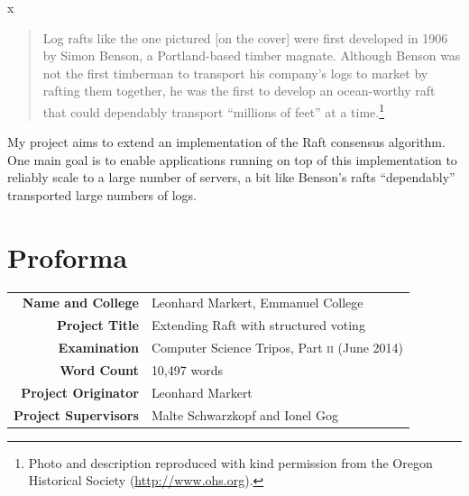 \documentclass[12pt,chapterprefix=true,toc=bibliography,numbers=noendperiod,
               footnotes=multiple,twoside]{scrreprt}
\begin{document}



\begin{titlepage}


{\color{white}x}

\vfil

\begin{quote}
Log rafts like the one pictured [on the cover] were first developed in 1906 by Simon Benson, a Portland-based timber magnate. Although Benson was not the first timberman to transport his company's logs to market by rafting them together, he was the first to develop an ocean-worthy raft that could dependably transport \enquote{millions of feet} at a time.\footnote{Photo \parencite{benson} and description reproduced with kind permission from the Oregon Historical Society (\url{http://www.ohs.org}).}
\end{quote}

My project aims to extend an implementation of the Raft consensus algorithm. One main goal is to enable applications running on top of this implementation to reliably scale to a large number of servers, a bit like Benson's rafts \enquote{dependably} transported large numbers of logs.

\end{titlepage}

\chapter*{Proforma}
\label{ch:proforma}

\begin{center}
{\renewcommand{\arraystretch}{1.5}%
\begin{tabularx}{359pt}{rX}
\textbf{Name and College} & Leonhard Markert, Emmanuel College \\
\textbf{Project Title} & Extending Raft with structured voting \\
\textbf{Examination} & Computer Science Tripos, Part \textsc{ii} (June 2014) \\
\textbf{Word Count} & 10,497 words \\
\textbf{Project Originator} & Leonhard Markert \\
\textbf{Project Supervisors} & Malte Schwarzkopf and Ionel Gog
\end{tabularx}}
\end{center}
\end{document}
